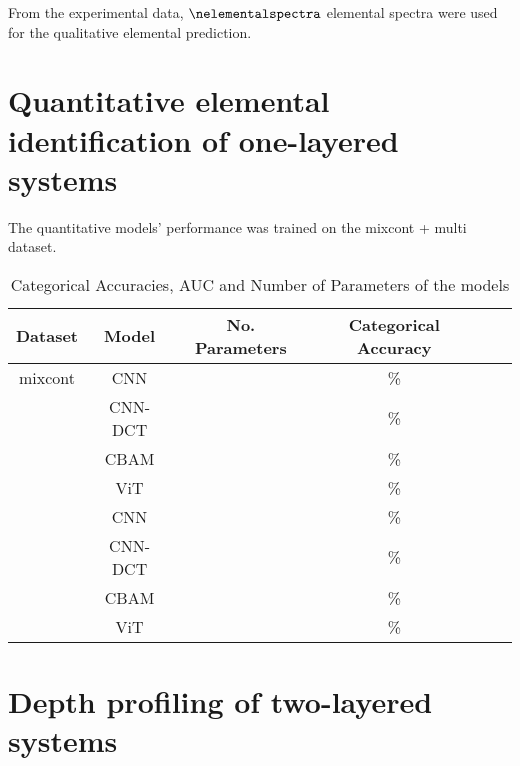 From the experimental data, $\nelementalspectra$ elemental spectra were used for the qualitative elemental prediction. 


\section{Quantitative elemental identification of one-layered systems}

The quantitative models' performance was trained on the mixcont + multi dataset.

\begin{table}[H]
    \centering
    \begin{tabular}{c|c|c|c|c|c}
        Dataset & Model   & No. Parameters & Categorical Accuracy      \\
        \hline
        mixcont & CNN     &                 &             \% \\
                & CNN-DCT &                 &             \% \\
                & CBAM    &                 &             \% \\
                & ViT     &                 &             \% \\
                & CNN     &                 &             \%  \\
                & CNN-DCT &                 &             \%  \\
                & CBAM    &                 &             \% \\
                & ViT     &                 &             \% \\
    \end{tabular}
    \caption{Categorical Accuracies, AUC and Number of Parameters of the models}
    \label{tab:acc_qual}
\end{table}




\section{Depth profiling of two-layered systems}
